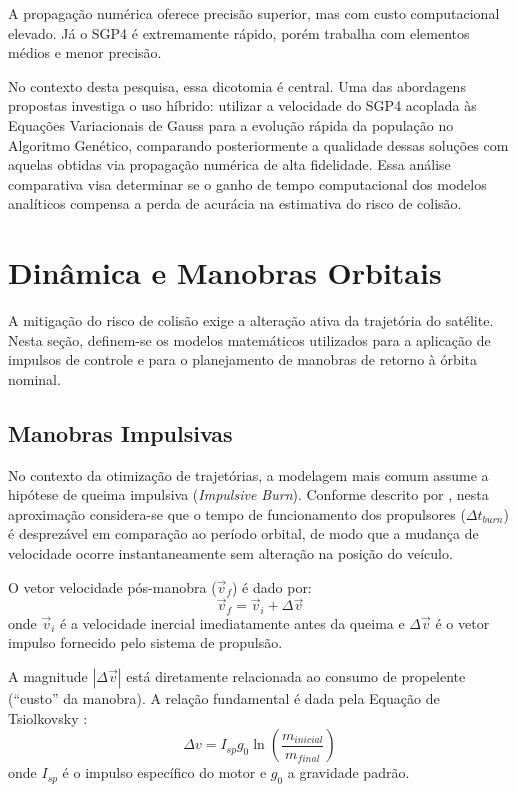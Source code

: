 A propagação numérica oferece precisão superior, mas com custo computacional elevado. Já o SGP4 é extremamente rápido, porém trabalha com elementos médios e menor precisão.

No contexto desta pesquisa, essa dicotomia é central. Uma das abordagens propostas investiga o uso híbrido: utilizar a velocidade do SGP4 acoplada às Equações Variacionais de Gauss para a evolução rápida da população no Algoritmo Genético, comparando posteriormente a qualidade dessas soluções com aquelas obtidas via propagação numérica de alta fidelidade. Essa análise comparativa visa determinar se o ganho de tempo computacional dos modelos analíticos compensa a perda de acurácia na estimativa do risco de colisão.

\section{Dinâmica e Manobras Orbitais}
\label{sec:dinamica_manobras}

A mitigação do risco de colisão exige a alteração ativa da trajetória do satélite. Nesta seção, definem-se os modelos matemáticos utilizados para a aplicação de impulsos de controle e para o planejamento de manobras de retorno à órbita nominal.

\subsection{Manobras Impulsivas}
\label{subsec:manobras_impulsivas}

No contexto da otimização de trajetórias, a modelagem mais comum assume a hipótese de queima impulsiva (\textit{Impulsive Burn}). Conforme descrito por , nesta aproximação considera-se que o tempo de funcionamento dos propulsores ($\Delta t_{burn}$) é desprezável em comparação ao período orbital, de modo que a mudança de velocidade ocorre instantaneamente sem alteração na posição do veículo.

O vetor velocidade pós-manobra ($\vec{v}_{f}$) é dado por:
\begin{equation}
    \vec{v}_{f} = \vec{v}_{i} + \Delta \vec{v}
\end{equation}
\noindent onde $\vec{v}_{i}$ é a velocidade inercial imediatamente antes da queima e $\Delta \vec{v}$ é o vetor impulso fornecido pelo sistema de propulsão.

A magnitude $|\Delta \vec{v}|$ está diretamente relacionada ao consumo de propelente (``custo'' da manobra). A relação fundamental é dada pela Equação de Tsiolkovsky \cite{Sutton2016, Vallado2013}:
\begin{equation}
    \Delta v = I_{sp} g_0 \ln \left( \frac{m_{inicial}}{m_{final}} \right)
\end{equation}
\noindent onde $I_{sp}$ é o impulso específico do motor e $g_0$ a gravidade padrão.

